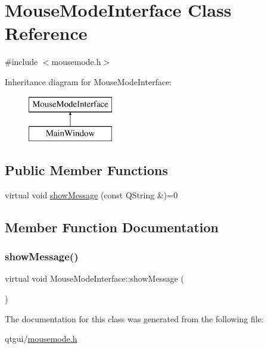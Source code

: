 \hypertarget{class_mouse_mode_interface}{}\section{Mouse\+Mode\+Interface Class Reference}
\label{class_mouse_mode_interface}


{\ttfamily \#include $<$mousemode.\+h$>$}

Inheritance diagram for Mouse\+Mode\+Interface\+:\begin{figure}[H]
\begin{center}
\leavevmode
\includegraphics[height=2.000000cm]{d3/d53/class_mouse_mode_interface}
\end{center}
\end{figure}
\subsection*{Public Member Functions}
\begin{DoxyCompactItemize}
\item 
virtual void \mbox{\hyperlink{class_mouse_mode_interface_aecf447f5c066e601b2aab8288863e778}{show\+Message}} (const Q\+String \&)=0
\end{DoxyCompactItemize}


\subsection{Member Function Documentation}
\mbox{\label{class_mouse_mode_interface_aecf447f5c066e601b2aab8288863e778}} 
\subsubsection{\texorpdfstring{showMessage()}{showMessage()}}
{\footnotesize\ttfamily virtual void Mouse\+Mode\+Interface\+::show\+Message (\begin{DoxyParamCaption}\item[{const Q\+String \&}]{ }\end{DoxyParamCaption})\hspace{0.3cm}{\ttfamily [pure virtual]}}



The documentation for this class was generated from the following file\+:\begin{DoxyCompactItemize}
\item 
qtgui/\mbox{\hyperlink{mousemode_8h}{mousemode.\+h}}\end{DoxyCompactItemize}
